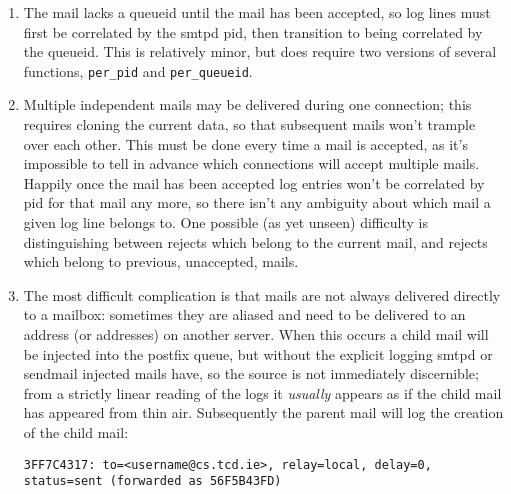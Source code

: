 \documentclass[a4paper,12pt,draft]{article}
\begin{document}
\begin{enumerate}

    \item The mail lacks a queueid until the mail has been accepted, so log
        lines must first be correlated by the smtpd pid, then transition to
        being correlated by the queueid.  This is relatively minor, but
        does require two versions of several functions,
        \texttt{per\_pid} and \texttt{per\_queueid}.

    \item Multiple independent mails may be delivered during one
        connection; this requires cloning the current data, so that
        subsequent mails won't trample over each other.  This must be done
        every time a mail is accepted, as it's impossible to tell in
        advance which connections will accept multiple mails.  Happily once
        the mail has been accepted log entries won't be correlated by pid
        for that mail any more, so there isn't any ambiguity about which
        mail a given log line belongs to.  One possible (as yet unseen)
        difficulty is distinguishing between rejects which belong to the
        current mail, and rejects which belong to previous, unaccepted,
        mails.

    \item The most difficult complication is that mails are not always
        delivered directly to a mailbox: sometimes they are aliased and
        need to be delivered to an address (or addresses) on another
        server.  When this occurs a child mail will be injected into the
        postfix queue, but without the explicit logging smtpd or sendmail
        injected mails have, so the source is not immediately discernible;
        from a strictly linear reading of the logs it \textit{usually}
        appears as if the child mail has appeared from thin air.
        Subsequently the parent mail will log the creation of the child
        mail:

        \texttt{3FF7C4317: to=<username@cs.tcd.ie>, relay=local, \newline delay=0,
        status=sent (forwarded as 56F5B43FD)}


\end{enumerate}
\end{document}
